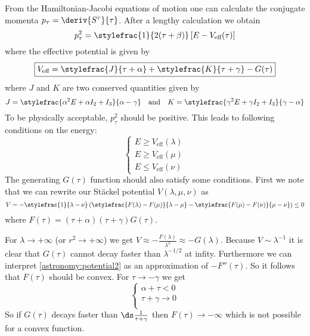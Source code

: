     From the Hamiltonian-Jacobi equations of motion one can calculate the conjugate momenta $p_\tau = \deriv{S^\tau}{\tau}$. After a lengthy calculation we obtain
    \begin{equation}
    	p_\tau^2 = \stylefrac{1}{2(\tau + \beta)}\left[E - V_{\text{eff}}(\tau)\right]
    \end{equation}
    where the effective potential is given by
    \begin{equation}
    	\boxed{V_{\text{eff}} = \stylefrac{J}{\tau + \alpha} + \stylefrac{K}{\tau + \gamma} - G(\tau)}
    \end{equation}
    where $J$ and $K$ are two conserved quantities given by
    \[J = \stylefrac{\alpha^2E + \alpha I_2 + I_3}{\alpha - \gamma} \quad\text{and}\quad K = \stylefrac{\gamma^2E + \gamma I_2 + I_3}{\gamma - \alpha}\]
    To be physically acceptable, $p_\tau^2$ should be positive. This leads to following conditions on the energy:
    \begin{equation}
    	\begin{cases}
    		E\geq V_{\text{eff}}(\lambda)\\
            E\geq V_{\text{eff}}(\mu)\\
            E\leq V_{\text{eff}}(\nu)
    	\end{cases}
    \end{equation}The generating $G(\tau)$ function should also satisfy some conditions. First we note that we can rewrite our St\"ackel potential $V(\lambda, \mu, \nu)$ as
    \begin{equation}
    	\label{astronomy:potential2}
    	V = -\stylefrac{1}{\lambda - \nu}\left(\stylefrac{F(\lambda) - F(\mu)}{\lambda - \mu} - \stylefrac{F(\mu) - F(\nu)}{\mu - \nu}\right) \leq 0
    \end{equation}
    where $F(\tau) = (\tau + \alpha)(\tau + \gamma)G(\tau)$.
    
     For $\lambda\rightarrow+\infty$ (or $r^2\rightarrow+\infty$) we get $V \approx -\frac{F(\lambda)}{\lambda^2} \approx -G(\lambda)$. Because $V\sim \lambda^{-1}$ it is clear that $G(\tau)$ cannot decay faster than $\lambda^{-1/2}$ at infity. Furthermore we can interpret \ref{astronomy:potential2} as an approximation of $-F''(\tau)$. So it follows that $F(\tau)$ should be convex. For $\tau\rightarrow-\gamma$ we get
    \[\begin{cases}
    	\alpha + \tau < 0\\
        \tau + \gamma \rightarrow 0\\
    \end{cases}\]
    So if $G(\tau)$ decays faster than $\ds\frac{1}{\tau + \gamma}$ then $F(\tau)\rightarrow-\infty$ which is not possible for a convex function.
    
